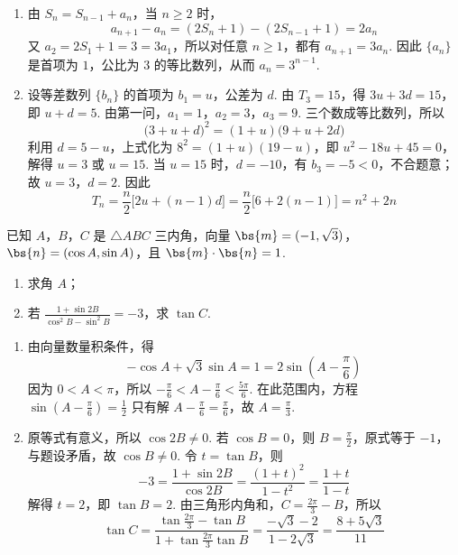 \begin{solution}
\begin{enumerate}
\item 由 \(S_n=S_{n-1}+a_n\)，当 \(n\geqslant 2\) 时，
\[
a_{n+1}-a_n=(2S_n+1)-(2S_{n-1}+1)=2a_n
\]
又 \(a_2=2S_1+1=3=3a_1\)，所以对任意 \(n\geqslant 1\)，都有 \(a_{n+1}=3a_n\). 因此 \(\{a_n\}\) 是首项为 \(1\)，公比为 \(3\) 的等比数列，从而 \(a_n=3^{n-1}\).

\item 设等差数列 \(\{b_n\}\) 的首项为 \(b_1=u\)，公差为 \(d\). 由 \(T_3=15\)，得
\(3u+3d=15\)，即 \(u+d=5\).
由第一问，\(a_1=1\)，\(a_2=3\)，\(a_3=9\). 三个数成等比数列，所以
\[
\bigl(3+u+d\bigr)^2=(1+u)\bigl(9+u+2d\bigr)
\]
利用 \(d=5-u\)，上式化为 \(8^2=(1+u)(19-u)\)，即 \(u^2-18u+45=0\)，解得 \(u=3\) 或 \(u=15\). 当 \(u=15\) 时，\(d=-10\)，有 \(b_3=-5<0\)，不合题意；故 \(u=3\)，\(d=2\). 因此
\[
T_n=\frac{n}{2}\bigl[2u+(n-1)d\bigr]=\frac{n}{2}\bigl[6+2(n-1)\bigr]=n^2+2n
\]
\end{enumerate}
\end{solution}

\begin{problem}
已知 \(A\)，\(B\)，\(C\) 是 \(\triangle ABC\) 三内角，向量 \(\bs{m} = (-1, \sqrt{3})\)，\(\bs{n} = (\cos A, \sin A)\)，且 \(\bs{m} \cdot \bs{n} = 1\).

\begin{enumerate}
\item 求角 \(A\)；
\item 若 \(\frac{1 + \sin 2B}{\cos^2 B - \sin^2 B} = -3\)，求 \(\tan C\).
\end{enumerate}
\end{problem}

\begin{solution}
\begin{enumerate}
\item 由向量数量积条件，得
\[
-\cos A+\sqrt{3}\sin A=1=2\sin\left(A-\frac{\pi}{6}\right)
\]
因为 \(0<A<\pi\)，所以 \(-\frac{\pi}{6}<A-\frac{\pi}{6}<\frac{5\pi}{6}\). 在此范围内，方程 \(\sin\left(A-\frac{\pi}{6}\right)=\frac{1}{2}\) 只有解 \(A-\frac{\pi}{6}=\frac{\pi}{6}\)，故 \(A=\frac{\pi}{3}\).

\item 原等式有意义，所以 \(\cos 2B\ne 0\). 若 \(\cos B=0\)，则 \(B=\frac{\pi}{2}\)，原式等于 \(-1\)，与题设矛盾，故 \(\cos B\ne 0\). 令 \(t=\tan B\)，则
\[
-3=\frac{1+\sin 2B}{\cos 2B}=\frac{(1+t)^2}{1-t^2}=\frac{1+t}{1-t}
\]
解得 \(t=2\)，即 \(\tan B=2\). 由三角形内角和，\(C=\frac{2\pi}{3}-B\)，所以
\[
\tan C=\frac{\tan\frac{2\pi}{3}-\tan B}{1+\tan\frac{2\pi}{3}\tan B}
=\frac{-\sqrt{3}-2}{1-2\sqrt{3}}=\frac{8+5\sqrt{3}}{11}
\]
\end{enumerate}
\end{solution}

